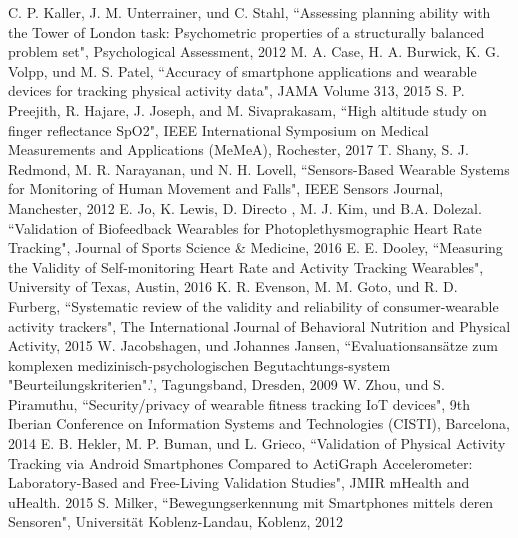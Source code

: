\documentclass[conference]{IEEEtran}
\begin{document}
\begin{thebibliography}{00}
 C. P. Kaller, J. M. Unterrainer, und C. Stahl, ``Assessing planning ability with the Tower of London task: Psychometric properties of a structurally balanced problem set", Psychological Assessment, 2012
 M. A. Case, H. A. Burwick, K. G. Volpp, und M. S. Patel, ``Accuracy of smartphone applications and wearable devices for tracking physical activity data", JAMA Volume 313, 2015
S. P. Preejith, R. Hajare, J. Joseph, and M. Sivaprakasam, ``High altitude study on finger reflectance SpO2", IEEE International Symposium on Medical Measurements and Applications (MeMeA), Rochester, 2017
T. Shany, S. J. Redmond, M. R. Narayanan, und N. H. Lovell, ``Sensors-Based Wearable Systems for Monitoring of Human Movement and Falls", IEEE Sensors Journal, Manchester, 2012
 E. Jo, K. Lewis, D. Directo , M. J.  Kim, und B.A. Dolezal. ``Validation of Biofeedback Wearables for Photoplethysmographic Heart Rate Tracking", Journal of Sports Science \& Medicine, 2016
 E. E. Dooley, ``Measuring the Validity of Self-monitoring Heart Rate and Activity Tracking Wearables", University of Texas, Austin, 2016
 K. R. Evenson, M. M. Goto, und R. D. Furberg, ``Systematic review of the validity and reliability of consumer-wearable activity trackers", The International Journal of Behavioral Nutrition and Physical Activity, 2015
 W. Jacobshagen, und Johannes Jansen, ``Evaluationsansätze zum komplexen medizinisch-psychologischen Begutachtungs-system "Beurteilungskriterien".', Tagungsband,  Dresden, 2009
 W. Zhou, und S. Piramuthu, ``Security/privacy of wearable fitness tracking IoT devices", 9th Iberian Conference on Information Systems and Technologies (CISTI), Barcelona, 2014
 E. B. Hekler, M. P. Buman, und L. Grieco, ``Validation of Physical Activity Tracking via Android Smartphones Compared to ActiGraph Accelerometer: Laboratory-Based and Free-Living Validation Studies", JMIR mHealth and uHealth. 2015
 S. Milker, ``Bewegungserkennung mit Smartphones mittels deren Sensoren", Universität Koblenz-Landau, Koblenz, 2012
\end{thebibliography}
\end{document}
